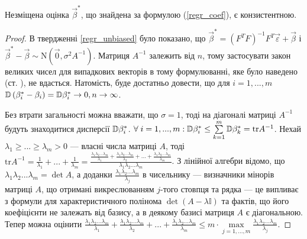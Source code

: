 \begin{proposition}
    Незміщена оцінка $\vec{\beta}^*$, що знайдена за формулою
    (\ref{regr_coef}), є конзистентною.
\end{proposition}
\begin{proof}
    В твердженні \ref{regr_unbiased} було показано, що
    $\vec{\beta}^* = (F^T F)^{-1} F^T \vec{\varepsilon} + \vec{\beta}$ і $\vec{\beta}^* - \vec{\beta} \sim \mathrm{N}(\vec{0},\sigma^2 A^{-1})$.
    Матриця $A^{-1}$ залежить від $n$, тому застосувати закон великих чисел
    для випадкових векторів в тому формулюванні, яке було наведено (ст. \pageref{multivar_lln}), не вдасться.
    Натомість, буде достатньо довести, що для $i=1,..., m$ $\mathbb{D}\left(\beta^*_i - \beta_i\right) = \mathbb{D}\beta^*_i \to 0 , n \to \infty$. 
    
    Без втрати загальності
    можна вважати, що $\sigma = 1$, тоді на діагоналі матриці $A^{-1}$ будуть знаходитися дисперсії $\mathbb{D}\beta_i^*$.
    $\forall \; i = 1,..., m : \mathbb{D}\beta_i^* \leq \sum\limits_{k=1}^m \mathbb{D}\beta_k^* = \mathrm{tr} A^{-1}$.
    Нехай $\lambda_1 \geq ... \geq \lambda_m > 0$ --- власні числа матриці $A$, тоді
    $\mathrm{tr} A^{-1} = \frac{1}{\lambda_1} + ... + \frac{1}{\lambda_m} = 
    \frac{
        \frac{\lambda_1 \lambda_2 ... \lambda_m}{\lambda_1} + 
        \frac{\lambda_1 \lambda_2 ... \lambda_m}{\lambda_2} + ... +
        \frac{\lambda_1 \lambda_2 ... \lambda_m}{\lambda_m}
    }{\lambda_1 \lambda_2 ... \lambda_m}$. З лінійної алгебри відомо, що
    $\lambda_1 \lambda_2 ... \lambda_m = \det A$, а доданки $\frac{\lambda_1 \lambda_2 ... \lambda_m}{\lambda_j}$ в чисельнику --- визначники мінорів матриці $A$,
    що отримані викреслюванням $j$-того стовпця та рядка --- це випливає з формули для характеристичного полінома
    $\det(A - \lambda \mathbb{I})$ та фактів, що його коефіцієнти не залежать від базису, а в деякому базисі матриця $A$ є діагональною.
    Тепер можна оцінити $\frac{\lambda_1 \lambda_2 ... \lambda_m}{\lambda_1} + 
    \frac{\lambda_1 \lambda_2 ... \lambda_m}{\lambda_2} + ... +
    \frac{\lambda_1 \lambda_2 ... \lambda_m}{\lambda_m} \leq m \cdot \underset{j=1,...,m}{\max}\frac{\lambda_1 \lambda_2 ... \lambda_m}{\lambda_j}$.


\end{proof}
